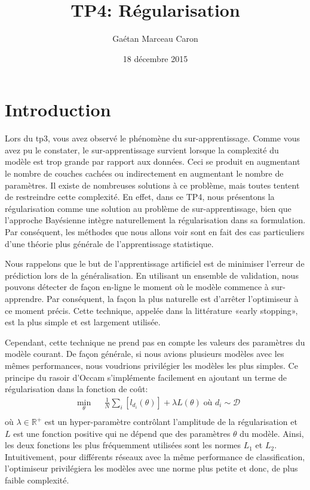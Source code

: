 \documentclass{article}
\title{TP4: Régularisation}
\author{Gaétan Marceau Caron}
\date{18 décembre 2015}
\begin{document}
\maketitle

\section{Introduction}
Lors du tp3, vous avez observé le phénomène du sur-apprentissage.
Comme vous avez pu le constater, le sur-apprentissage survient lorsque la complexité du modèle est trop grande par rapport aux données.
Ceci se produit en augmentant le nombre de couches cachées ou indirectement en augmentant le nombre de paramètres.
Il existe de nombreuses solutions à ce problème, mais toutes tentent de restreindre cette complexité.
En effet, dans ce TP4, nous présentons la régularisation comme une solution au problème de sur-apprentissage, bien que l'approche Bayésienne intègre naturellement la régularisation dans sa formulation.
Par conséquent, les méthodes que nous allons voir sont en fait des cas particuliers d'une théorie plus générale de l'apprentissage statistique.

Nous rappelons que le but de l'apprentissage artificiel est de minimiser l'erreur de prédiction lors de la généralisation.
En utilisant un ensemble de validation, nous pouvons détecter de façon en-ligne le moment où le modèle commence à sur-apprendre.
Par conséquent, la façon la plus naturelle est d'arrêter l'optimiseur à ce moment précis.
Cette technique, appelée dans la littérature «early stopping», est la plus simple et est largement utilisée.

Cependant, cette technique ne prend pas en compte les valeurs des paramètres du modèle courant.
De façon générale, si nous avions plusieurs modèles avec les mêmes performances, nous voudrions privilégier les modèles les plus simples.
Ce principe du rasoir d'Occam s'implémente facilement en ajoutant un terme de régularisation dans la fonction de coût:
\begin{equation}
\label{eqn_emprisk}
\begin{aligned}
& \underset{\theta}{\text{min}}
& & \frac{1}{N} \sum_i \left[ l_{d_i}(\theta) \right] + \lambda L(\theta)  \; \mbox{où $d_i \sim \mathcal{D}$}\\
\end{aligned}
\end{equation}
où $\lambda \in \mathbb{R}^+$ est un hyper-paramètre contrôlant l'amplitude de la régularisation et $L$ est une fonction positive qui ne dépend que des paramètres $\theta$ du modèle.
Ainsi, les deux fonctions les plus fréquemment utilisées sont les normes $L_1$ et $L_2$.
Intuitivement, pour différents réseaux avec la même performance de classification, l'optimiseur privilégiera les modèles avec une norme plus petite et donc, de plus faible complexité.
\end{document}
